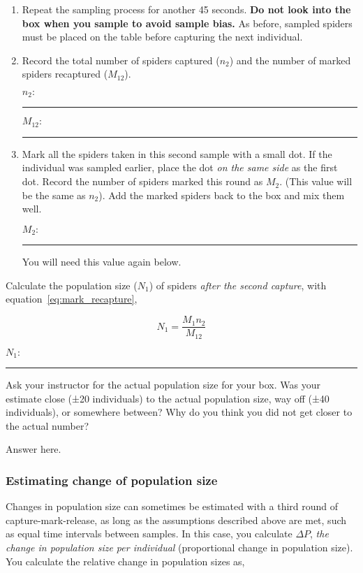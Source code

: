 \documentclass[12pt, hidelinks]{exam}
\newcommand*\AnswerBox[2]{%
    \parbox[t][#1]{0.92\textwidth}{%
    \begin{solution}#2\end{solution}}
    \vspace{\stretch{1}}
}
\begin{document}
\begin{questions}
\begin{enumerate}

	\item Repeat the sampling process for another 45 seconds.  \textbf{Do not look into the box when you sample to avoid sample bias.} As before, sampled spiders must be placed on the table before capturing the next individual. %
	
	\item Record the total number of spiders captured ($n_2$) and the
	number of marked spiders recaptured ($M_{12}$). 
	
	\bigskip
	
	$n_2\colon$ \rule{0.75in}{0.4pt} \bigskip
	
	$M_{12}\colon$ \rule{0.75in}{0.4pt}
	
	\item Mark all the spiders taken in this second sample with a small dot. If the individual was sampled earlier, place the dot \emph{on the same side} as the first dot. Record the 	number of spiders marked this round as $M_2$. (This value will
	be the same as $n_2$). Add the marked spiders back to the box and mix them well.
	
	\bigskip
	
	$M_2\colon$ \rule{0.75in}{0.4pt}
	
	You will need this value again below.
	
\end{enumerate}

\question
Calculate the population size ($N_1$) of
spiders \emph{after the second capture}, with equation~\ref{eq:mark_recapture},

\[ N_1 = \dfrac{M_1 n_2}{M_{12}}\]

\medskip

$N_1\colon$ \rule{0.75in}{0.4pt}

\question
Ask your instructor for the actual population size for your box. Was your estimate close (±20 individuals) to the actual population size, way off (±40 individuals), or somewhere between? Why do you think you did not get closer to the actual number?

\AnswerBox{2\baselineskip}{Answer here.}

\subsubsection*{Estimating change of population size}

Changes in population size can sometimes be estimated with a third round of capture-mark-release, as long as the assumptions described above are met, such as equal time intervals between samples. In this case, you calculate
$\Delta P$, \emph{the change in population size per individual} (proportional change in
population size). You calculate the relative change in
population sizes as,


\end{questions}
\end{document}
